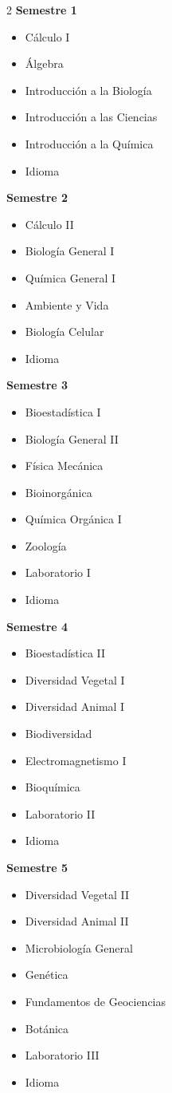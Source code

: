 \documentclass[12pt,a4paper]{article}
\begin{document}
	\begin{multicols}{2}
		\textbf{Semestre 1}
		\begin{itemize}
			\item Cálculo I
			\item Álgebra
			\item Introducción a la Biología
			\item Introducción a las Ciencias
			\item Introducción a la Química
			\item Idioma
		\end{itemize}
		
		\textbf{Semestre 2}
		\begin{itemize}
			\item Cálculo II
			\item Biología General I
			\item Química General I
			\item Ambiente y Vida
			\item Biología Celular
			\item Idioma
		\end{itemize}
		
		\textbf{Semestre 3}
		\begin{itemize}
			\item Bioestadística I
			\item Biología General II
			\item Física Mecánica
			\item Bioinorgánica
			\item Química Orgánica I
			\item Zoología
			\item Laboratorio I
			\item Idioma
		\end{itemize}
		
		\textbf{Semestre 4}
		\begin{itemize}
			\item Bioestadística II
			\item Diversidad Vegetal I
			\item Diversidad Animal I
			\item Biodiversidad
			\item Electromagnetismo I
			\item Bioquímica
			\item Laboratorio II
			\item Idioma
		\end{itemize}
		
		\textbf{Semestre 5}
		\begin{itemize}
			\item Diversidad Vegetal II
			\item Diversidad Animal II
			\item Microbiología General
			\item Genética
			\item Fundamentos de Geociencias
			\item Botánica
			\item Laboratorio III
			\item Idioma
		\end{itemize}
		

\end{multicols}
\end{document}
